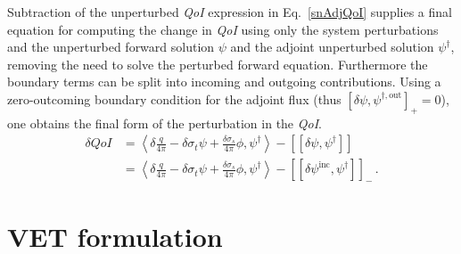 \documentclass[12pt]{report}
\newcommand{\bra}{\left\langle}
\newcommand{\ket}{\right\rangle}
\newcommand{\sbraSN}{\left[ \! \left[}
\newcommand{\sketSN}{\right] \! \right]}
\newcommand{\sbra}{\left[}
\newcommand{\sket}{\right]}
\newcommand{\sigt}{\sigma_t}
\newcommand{\sigs}{\sigma_s}
\newcommand{\angSource}{\frac{q}{4 \pi}}
\newcommand{\qoi}{{\it QoI}\xspace}
\begin{document}
Subtraction of the unperturbed \qoi expression in Eq.~\eqref{snAdjQoI} supplies a final equation for computing the change in \qoi using only the system perturbations and the unperturbed forward solution $\psi$ and the adjoint unperturbed
solution $\psi^\dag$, removing the need to solve the perturbed forward equation. 
Furthermore the boundary terms can be split into incoming and outgoing contributions.
Using a zero-outcoming  boundary condition for the adjoint flux
(thus $\sbra \delta \psi, \psi^{\dag,\text{out}} \sket_+=0$), one obtains the final 
form of the perturbation in the \qoi.
\begin{equation}
\label{snSens}
\begin{split}
\delta QoI &= \bra \delta \angSource - \delta \sigt \psi + \frac{\delta\sigs}{4 \pi} \phi  , \psi^\dag  \ket - \sbraSN \delta \psi, \psi^\dag \sketSN \\
&= \bra \delta \angSource - \delta \sigt \psi + \frac{\delta\sigs}{4 \pi} \phi , \psi^\dag  \ket - \sbraSN \delta \psi^{\text{inc}}, \psi^\dag \sketSN_- \,.
\end{split}
\end{equation}

\section{VET formulation}

\end{document}
